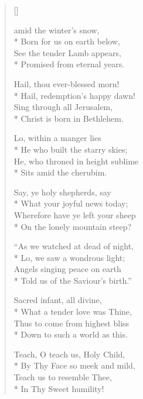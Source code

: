 \newHymn
{}

\begin{verse}[\versewidth]

 amid the winter's snow,\\*
Born for us on earth below,\\
See the tender Lamb appears,\\*
Promised from eternal years.

\begin{indentedVerse}
 \vin Hail, thou ever-blessed morn!\\*
  \vin      Hail, redemption's happy dawn!\\
  \vin      Sing through all Jerusalem,\\*
  \vin      Christ is born in Bethlehem.
\end{indentedVerse}

 Lo, within a manger lies\\*
He who built the starry skies;\\
He, who throned in height sublime\\*
Sits amid the cherubim. 

 Say, ye holy shepherds, say\\*
What your joyful news today;\\
Wherefore have ye left your sheep\\*
On the lonely mountain steep? 

 ``As we watched at dead of night,\\*
Lo, we saw a wondrous light;\\
Angels singing peace on earth\\*
Told us of the Saviour's birth.'' 

 Sacred infant, all divine,\\*
What a tender love was Thine,\\
Thus to come from highest bliss\\*
Down to such a world as this. 

 Teach, O teach us, Holy Child,\\*
By Thy Face so meek and mild,\\
Teach us to resemble Thee,\\*
In Thy Sweet humility! 

\end{verse}


